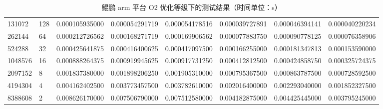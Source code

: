\documentclass[a4paper]{article}
\begin{document}
\begin{table}[]
{\begin{tabular}{llllllll}
      131072  & 128     & 0.000105935000 & 0.000054291719  & 0.000054178516 & 0.000039727891 & 0.000046394141 & 0.000040220234 \\
      262144  & 64      & 0.000212726562 & 0.000168271719  & 0.000169906562 & 0.000077883750 & 0.000090778125 & 0.000076358906 \\
      524288  & 32      & 0.000425641875 & 0.000416400625  & 0.000417097500 & 0.000166255000 & 0.000181347813 & 0.000153590000 \\
      1048576 & 16      & 0.000888264375 & 0.000919945625  & 0.000917731250 & 0.000412812500 & 0.000424858750 & 0.000325724375 \\
      2097152 & 8       & 0.001837380000 & 0.001898206250  & 0.001905310000 & 0.000795367500 & 0.000863787500 & 0.000728592500 \\
      4194304 & 4       & 0.004162402500 & 0.003773457500  & 0.003782610000 & 0.002016400000 & 0.002293040000 & 0.001852327500 \\
      8388608 & 2       & 0.008626170000 & 0.007506790000  & 0.007512580000 & 0.004182875000 & 0.004425445000 & 0.003795245000
    \end{tabular}%
  }
  \caption{鲲鹏 arm 平台 O2 优化等级下的测试结果（时间单位：s）}
  \label{tab:arm-O2-test}
\end{table}
\end{document}
